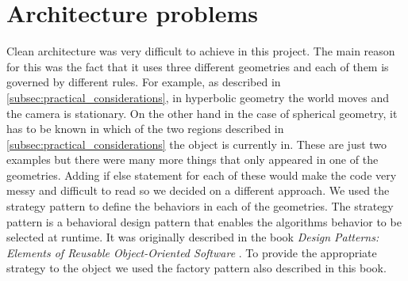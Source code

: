 \section{Architecture problems} \label{sec:architecture_problems}
Clean architecture was very difficult to achieve in this project.
The main reason for this was the fact that it uses three different geometries and each of them is governed by different rules.
For example, as described in \autoref{subsec:practical_considerations}, in hyperbolic geometry the world moves and the camera is stationary.
On the other hand in the case of spherical geometry, it has to be known in which of the two regions described in \autoref{subsec:practical_considerations} the object is currently in.
These are just two examples but there were many more things that only appeared in one of the geometries.
Adding if else statement for each of these would make the code very messy and difficult to read so we decided on a different approach.
We used the strategy pattern to define the behaviors in each of the geometries.
The strategy pattern is a behavioral design pattern that enables the algorithms behavior to be selected at runtime.
It was originally described in the book \textit{Design Patterns: Elements of Reusable Object-Oriented Software} \cite{Design-Patterns}.
To provide the appropriate strategy to the object we used the factory pattern also described in this book.
